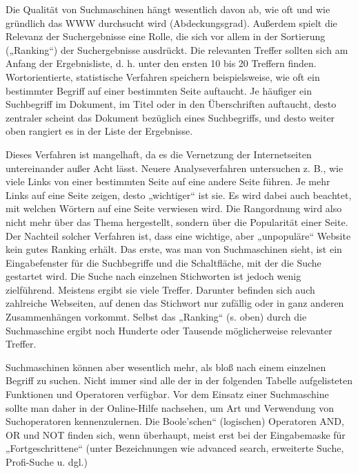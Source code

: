 \documentclass[]{book}
\theoremstyle{definition}
\theoremstyle{definition}
\theoremstyle{definition}
\theoremstyle{remark}
\begin{document}
Die Qualität von Suchmaschinen hängt wesentlich davon ab, wie oft und
wie gründlich das WWW durchsucht wird (Abdeckungsgrad). Außerdem spielt
die Relevanz der Suchergebnisse eine Rolle, die sich vor allem in der
Sortierung („Ranking``) der Suchergebnisse ausdrückt. Die relevanten
Treffer sollten sich am Anfang der Ergebnisliste, d. h. unter den ersten
10 bis 20 Treffern finden. Wortorientierte, statistische Verfahren
speichern beispielsweise, wie oft ein bestimmter Begriff auf einer
bestimmten Seite auftaucht. Je häufiger ein Suchbegriff im Dokument, im
Titel oder in den Überschriften auftaucht, desto zentraler scheint das
Dokument bezüglich eines Suchbegriffs, und desto weiter oben rangiert es
in der Liste der Ergebnisse.

Dieses Verfahren ist mangelhaft, da es die Vernetzung der Internetseiten
untereinander außer Acht lässt. Neuere Analyseverfahren untersuchen z.
B., wie viele Links von einer bestimmten Seite auf eine andere Seite
führen. Je mehr Links auf eine Seite zeigen, desto „wichtiger`` ist sie.
Es wird dabei auch beachtet, mit welchen Wörtern auf eine Seite
verwiesen wird. Die Rangordnung wird also nicht mehr über das Thema
hergestellt, sondern über die Popularität einer Seite. Der Nachteil
solcher Verfahren ist, dass eine wichtige, aber „unpopuläre`` Website
kein gutes Ranking erhält. Das erste, was man von Suchmaschinen sieht,
ist ein Eingabefenster für die Suchbegriffe und die Schaltfläche, mit
der die Suche gestartet wird. Die Suche nach einzelnen Stichworten ist
jedoch wenig zielführend. Meistens ergibt sie viele Treffer. Darunter
befinden sich auch zahlreiche Webseiten, auf denen das Stichwort nur
zufällig oder in ganz anderen Zusammenhängen vorkommt. Selbst das
„Ranking`` (s. oben) durch die Suchmaschine ergibt noch Hunderte oder
Tausende möglicherweise relevanter Treffer.

Suchmaschinen können aber wesentlich mehr, als bloß nach einem einzelnen
Begriff zu suchen. Nicht immer sind alle der in der folgenden Tabelle
aufgelisteten Funktionen und Operatoren verfügbar. Vor dem Einsatz einer
Suchmaschine sollte man daher in der Online-Hilfe nachsehen, um Art und
Verwendung von Suchoperatoren kennenzulernen. Die Boole'schen``
(logischen) Operatoren AND, OR und NOT finden sich, wenn überhaupt,
meist erst bei der Eingabemaske für „Fortgeschrittene`` (unter
Bezeichnungen wie advanced search, erweiterte Suche, Profi-Suche u.
dgl.)
\end{document}
